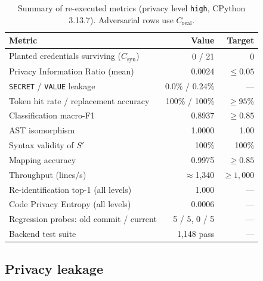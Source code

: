 \documentclass[conference]{IEEEtran}
\begin{document}
\begin{table}[!t]
\caption{Summary of re-executed metrics (privacy level \texttt{high},
CPython 3.13.7). Adversarial rows use $C_{\text{real}}$.}
\label{tab:summary}
\centering
\renewcommand{\arraystretch}{1.15}
\begin{tabular}{@{}lrr@{}}
\toprule
\textbf{Metric} & \textbf{Value} & \textbf{Target} \\
\midrule
Planted credentials surviving ($C_{\text{syn}}$)     & 0 / 21   & 0 \\
Privacy Information Ratio (mean)                      & 0.0024   & $\le 0.05$ \\
\;\; \texttt{SECRET} / \texttt{VALUE} leakage        & 0.0\% / 0.24\% & --- \\
Token hit rate / replacement accuracy                & 100\% / 100\% & $\ge 95\%$ \\
Classification macro-F1                               & 0.8937   & $\ge 0.85$ \\
AST isomorphism                                       & 1.0000   & 1.00 \\
Syntax validity of $S'$                               & 100\%    & 100\% \\
Mapping accuracy                                      & 0.9975   & $\ge 0.85$ \\
Throughput (lines/s)                                  & $\approx$1{,}340 & $\ge 1{,}000$ \\
Re-identification top-1 (all levels)                  & 1.000    & --- \\
Code Privacy Entropy (all levels)                     & 0.0006   & --- \\
Regression probes: old commit / current              & 5 / 5, 0 / 5 & --- \\
Backend test suite                                    & 1{,}148 pass & --- \\
\bottomrule
\end{tabular}
\end{table}

\subsection{Privacy leakage}
\end{document}
